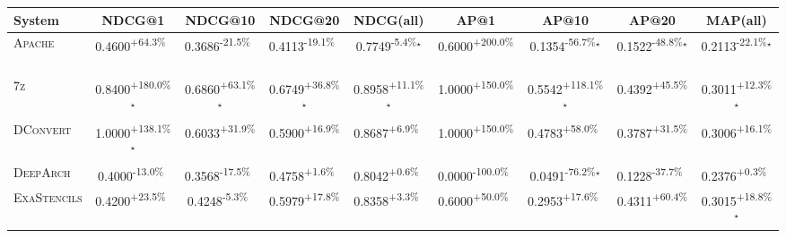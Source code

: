 \begin{table}[htbp]
\centering
\renewcommand{\arraystretch}{1.2}
\begin{tabular}{l|cccc|cccc}
\hline
System & NDCG@1 & NDCG@10 & NDCG@20 & NDCG(all) & AP@1 & AP@10 & AP@20 & MAP(all) \\ \hline
\textsc{Apache} & \cellcolor{green!30}0.4600\textsuperscript{+64.3\%}$^{\,\,\,}$ & \cellcolor{red!30}0.3686\textsuperscript{-21.5\%}$^{\,\,\,}$ & \cellcolor{red!30}0.4113\textsuperscript{-19.1\%}$^{\,\,\,}$ & \cellcolor{red!30}0.7749\textsuperscript{-5.4\%}$^\star$ & \cellcolor{green!30}0.6000\textsuperscript{+200.0\%}$^{\,\,\,}$ & \cellcolor{red!30}0.1354\textsuperscript{-56.7\%}$^\star$ & \cellcolor{red!30}0.1522\textsuperscript{-48.8\%}$^\star$ & \cellcolor{red!30}0.2113\textsuperscript{-22.1\%}$^\star$ \\
\textsc{7z} & \cellcolor{green!30}0.8400\textsuperscript{+180.0\%}$^\star$ & \cellcolor{green!30}0.6860\textsuperscript{+63.1\%}$^\star$ & \cellcolor{green!30}0.6749\textsuperscript{+36.8\%}$^\star$ & \cellcolor{green!30}0.8958\textsuperscript{+11.1\%}$^\star$ & \cellcolor{green!30}1.0000\textsuperscript{+150.0\%}$^{\,\,\,}$ & \cellcolor{green!30}0.5542\textsuperscript{+118.1\%}$^\star$ & \cellcolor{green!30}0.4392\textsuperscript{+45.5\%}$^{\,\,\,}$ & \cellcolor{green!30}0.3011\textsuperscript{+12.3\%}$^\star$ \\
\textsc{DConvert} & \cellcolor{green!30}1.0000\textsuperscript{+138.1\%}$^\star$ & \cellcolor{green!30}0.6033\textsuperscript{+31.9\%}$^{\,\,\,}$ & \cellcolor{green!30}0.5900\textsuperscript{+16.9\%}$^{\,\,\,}$ & \cellcolor{green!30}0.8687\textsuperscript{+6.9\%}$^{\,\,\,}$ & \cellcolor{green!30}1.0000\textsuperscript{+150.0\%}$^{\,\,\,}$ & \cellcolor{green!30}0.4783\textsuperscript{+58.0\%}$^{\,\,\,}$ & \cellcolor{green!30}0.3787\textsuperscript{+31.5\%}$^{\,\,\,}$ & \cellcolor{green!30}0.3006\textsuperscript{+16.1\%}$^{\,\,\,}$ \\
\textsc{DeepArch} & \cellcolor{red!30}0.4000\textsuperscript{-13.0\%}$^{\,\,\,}$ & \cellcolor{red!30}0.3568\textsuperscript{-17.5\%}$^{\,\,\,}$ & \cellcolor{green!30}0.4758\textsuperscript{+1.6\%}$^{\,\,\,}$ & \cellcolor{green!30}0.8042\textsuperscript{+0.6\%}$^{\,\,\,}$ & \cellcolor{red!30}0.0000\textsuperscript{-100.0\%}$^{\,\,\,}$ & \cellcolor{red!30}0.0491\textsuperscript{-76.2\%}$^\star$ & \cellcolor{red!30}0.1228\textsuperscript{-37.7\%}$^{\,\,\,}$ & \cellcolor{green!30}0.2376\textsuperscript{+0.3\%}$^{\,\,\,}$ \\
\textsc{ExaStencils} & \cellcolor{green!30}0.4200\textsuperscript{+23.5\%}$^{\,\,\,}$ & \cellcolor{red!30}0.4248\textsuperscript{-5.3\%}$^{\,\,\,}$ & \cellcolor{green!30}0.5979\textsuperscript{+17.8\%}$^{\,\,\,}$ & \cellcolor{green!30}0.8358\textsuperscript{+3.3\%}$^{\,\,\,}$ & \cellcolor{green!30}0.6000\textsuperscript{+50.0\%}$^{\,\,\,}$ & \cellcolor{green!30}0.2953\textsuperscript{+17.6\%}$^{\,\,\,}$ & \cellcolor{green!30}0.4311\textsuperscript{+60.4\%}$^{\,\,\,}$ & \cellcolor{green!30}0.3015\textsuperscript{+18.8\%}$^\star$ \\

\end{tabular}
\end{table}
